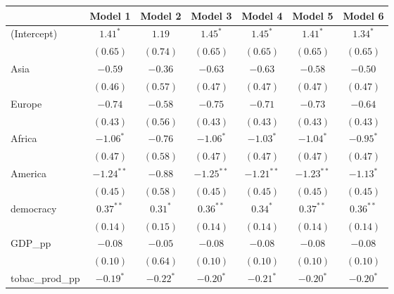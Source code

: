 
\begin{table}[!h]
\begin{center}
\begin{tabular}{l c c c c c c }
\toprule
 & Model 1 & Model 2 & Model 3 & Model 4 & Model 5 & Model 6 \\
\midrule
(Intercept)             & $1.41^{*}$   & $1.19$       & $1.45^{*}$   & $1.45^{*}$   & $1.41^{*}$   & $1.34^{*}$   \\
                        & $(0.65)$     & $(0.74)$     & $(0.65)$     & $(0.65)$     & $(0.65)$     & $(0.65)$     \\
Asia                    & $-0.59$      & $-0.36$      & $-0.63$      & $-0.63$      & $-0.58$      & $-0.50$      \\
                        & $(0.46)$     & $(0.57)$     & $(0.47)$     & $(0.47)$     & $(0.47)$     & $(0.47)$     \\
Europe                  & $-0.74$      & $-0.58$      & $-0.75$      & $-0.71$      & $-0.73$      & $-0.64$      \\
                        & $(0.43)$     & $(0.56)$     & $(0.43)$     & $(0.43)$     & $(0.43)$     & $(0.43)$     \\
Africa                  & $-1.06^{*}$  & $-0.76$      & $-1.06^{*}$  & $-1.03^{*}$  & $-1.04^{*}$  & $-0.95^{*}$  \\
                        & $(0.47)$     & $(0.58)$     & $(0.47)$     & $(0.47)$     & $(0.47)$     & $(0.47)$     \\
America                 & $-1.24^{**}$ & $-0.88$      & $-1.25^{**}$ & $-1.21^{**}$ & $-1.23^{**}$ & $-1.13^{*}$  \\
                        & $(0.45)$     & $(0.58)$     & $(0.45)$     & $(0.45)$     & $(0.45)$     & $(0.45)$     \\
democracy               & $0.37^{**}$  & $0.31^{*}$   & $0.36^{**}$  & $0.34^{*}$   & $0.37^{**}$  & $0.36^{**}$  \\
                        & $(0.14)$     & $(0.15)$     & $(0.14)$     & $(0.14)$     & $(0.14)$     & $(0.14)$     \\
GDP\_pp                 & $-0.08$      & $-0.05$      & $-0.08$      & $-0.08$      & $-0.08$      & $-0.08$      \\
                        & $(0.10)$     & $(0.64)$     & $(0.10)$     & $(0.10)$     & $(0.10)$     & $(0.10)$     \\
tobac\_prod\_pp         & $-0.19^{*}$  & $-0.22^{*}$  & $-0.20^{*}$  & $-0.21^{*}$  & $-0.20^{*}$  & $-0.20^{*}$  \\

\end{tabular}
\end{center}
\end{table}

